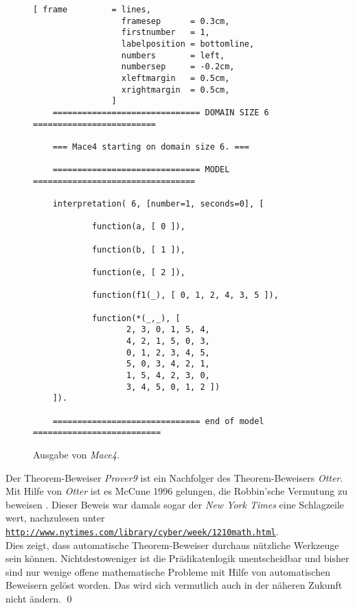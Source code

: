 \begin{figure}[!ht]
\centering
\begin{Verbatim}[ frame         = lines, 
                  framesep      = 0.3cm, 
                  firstnumber   = 1,
                  labelposition = bottomline,
                  numbers       = left,
                  numbersep     = -0.2cm,
                  xleftmargin   = 0.5cm,
                  xrightmargin  = 0.5cm,
                ]
    ============================== DOMAIN SIZE 6 =========================
    
    === Mace4 starting on domain size 6. ===
    
    ============================== MODEL =================================
    
    interpretation( 6, [number=1, seconds=0], [
    
            function(a, [ 0 ]),
    
            function(b, [ 1 ]),
    
            function(e, [ 2 ]),
    
            function(f1(_), [ 0, 1, 2, 4, 3, 5 ]),
    
            function(*(_,_), [
    			   2, 3, 0, 1, 5, 4,
    			   4, 2, 1, 5, 0, 3,
    			   0, 1, 2, 3, 4, 5,
    			   5, 0, 3, 4, 2, 1,
    			   1, 5, 4, 2, 3, 0,
    			   3, 4, 5, 0, 1, 2 ])
    ]).
    
    ============================== end of model ==========================
\end{Verbatim}
\vspace*{-0.3cm}
\caption{Ausgabe von \textsl{Mace4}.}
\label{fig:group.out}
\end{figure}

\remark
Der Theorem-Beweiser \textsl{Prover9} ist ein Nachfolger des Theorem-Beweisers \textsl{Otter}.  Mit Hilfe von
\textsl{Otter} ist es McCune 1996 gelungen, die Robbin'sche Vermutung zu beweisen \cite{mccune:1997}.
Dieser Beweis war damals sogar der \emph{New York Times} eine Schlagzeile wert,
nachzulesen unter
\\[0.2cm]
\hspace*{1.3cm}
\href{http://www.nytimes.com/library/cyber/week/1210math.html}{\texttt{http://www.nytimes.com/library/cyber/week/1210math.html}}.
\\[0.2cm]
Dies zeigt, dass automatische Theorem-Beweiser durchaus n\"{u}tzliche Werkzeuge sein
k\"{o}nnen.  Nichtdestoweniger  ist die Pr\"{a}dikatenlogik unentscheidbar und bisher sind 
nur wenige offene mathematische  Probleme mit Hilfe von automatischen Beweisern gel\"{o}st
worden.  Das wird sich vermutlich auch in der n\"{a}heren Zukunft nicht 
\"{a}ndern.  \qed


